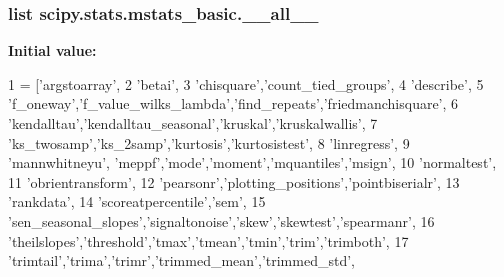 \begin{DoxyVerb}
\begin{DoxyVerb}
\subsubsection[{\+\_\+\+\_\+all\+\_\+\+\_\+}]{\setlength{\rightskip}{0pt plus 5cm}list scipy.\+stats.\+mstats\+\_\+basic.\+\_\+\+\_\+all\+\_\+\+\_\+}\label{namespacescipy_1_1stats_1_1mstats__basic_ae5a519977e74f95928e24b370e209114}
{\bfseries Initial value\+:}
\begin{DoxyCode}
1 = [\textcolor{stringliteral}{'argstoarray'},
2            \textcolor{stringliteral}{'betai'},
3            \textcolor{stringliteral}{'chisquare'},\textcolor{stringliteral}{'count\_tied\_groups'},
4            \textcolor{stringliteral}{'describe'},
5            \textcolor{stringliteral}{'f\_oneway'},\textcolor{stringliteral}{'f\_value\_wilks\_lambda'},\textcolor{stringliteral}{'find\_repeats'},\textcolor{stringliteral}{'friedmanchisquare'},
6            \textcolor{stringliteral}{'kendalltau'},\textcolor{stringliteral}{'kendalltau\_seasonal'},\textcolor{stringliteral}{'kruskal'},\textcolor{stringliteral}{'kruskalwallis'},
7            \textcolor{stringliteral}{'ks\_twosamp'},\textcolor{stringliteral}{'ks\_2samp'},\textcolor{stringliteral}{'kurtosis'},\textcolor{stringliteral}{'kurtosistest'},
8            \textcolor{stringliteral}{'linregress'},
9            \textcolor{stringliteral}{'mannwhitneyu'}, \textcolor{stringliteral}{'meppf'},\textcolor{stringliteral}{'mode'},\textcolor{stringliteral}{'moment'},\textcolor{stringliteral}{'mquantiles'},\textcolor{stringliteral}{'msign'},
10            \textcolor{stringliteral}{'normaltest'},
11            \textcolor{stringliteral}{'obrientransform'},
12            \textcolor{stringliteral}{'pearsonr'},\textcolor{stringliteral}{'plotting\_positions'},\textcolor{stringliteral}{'pointbiserialr'},
13            \textcolor{stringliteral}{'rankdata'},
14            \textcolor{stringliteral}{'scoreatpercentile'},\textcolor{stringliteral}{'sem'},
15            \textcolor{stringliteral}{'sen\_seasonal\_slopes'},\textcolor{stringliteral}{'signaltonoise'},\textcolor{stringliteral}{'skew'},\textcolor{stringliteral}{'skewtest'},\textcolor{stringliteral}{'spearmanr'},
16            \textcolor{stringliteral}{'theilslopes'},\textcolor{stringliteral}{'threshold'},\textcolor{stringliteral}{'tmax'},\textcolor{stringliteral}{'tmean'},\textcolor{stringliteral}{'tmin'},\textcolor{stringliteral}{'trim'},\textcolor{stringliteral}{'trimboth'},
17            \textcolor{stringliteral}{'trimtail'},\textcolor{stringliteral}{'trima'},\textcolor{stringliteral}{'trimr'},\textcolor{stringliteral}{'trimmed\_mean'},\textcolor{stringliteral}{'trimmed\_std'},

\end{DoxyCode}
\end{DoxyVerb}
\end{DoxyVerb}
